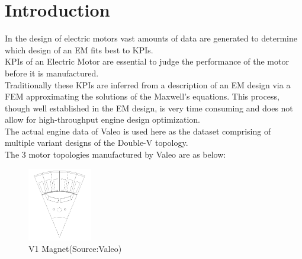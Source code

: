 \documentclass{report} %
\begin{document}
\chapter*{Introduction} 
In the design of electric motors vast amounts of data are generated to determine which design of an EM fits best to KPIs. \\
KPIs of an Electric Motor are essential to judge the performance of the motor before it is manufactured. \\
Traditionally these KPIs are inferred from a description of an EM design via a FEM approximating the solutions of the Maxwell’s equations. This process, though well established in the EM design, is very time consuming and does not allow for high-throughput engine design optimization. \\
The actual engine data of Valeo is used here as the dataset comprising of multiple variant designs of the Double-V topology.\\
The 3 motor topologies manufactured by Valeo are as below:



\begin{figure}[h]
    \centering
    \includegraphics[width=0.25\textwidth]{./ReportImages/1V_Magnet.png}
    \caption{V1 Magnet(Source:Valeo)}
    \label{fig:V1 Magnet}
\end{figure}
\end{document}
